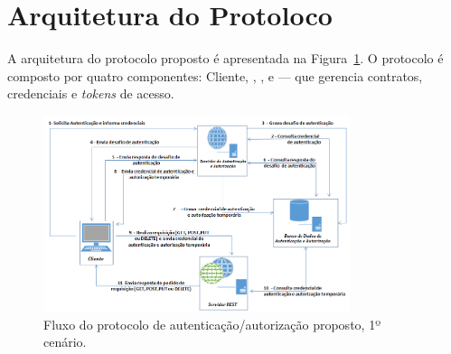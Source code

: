 
\section{Arquitetura do Protoloco}\label{sec:ArqProtocolo}

A arquitetura do protocolo proposto é apresentada na Figura~\ref{fig:arquiteturaprotocolo}. O protocolo é composto por quatro componentes: Cliente,
\servidorAA, \servidorRest, e \servidorBD--- que gerencia contratos, credenciais e \emph{tokens} de acesso.

\begin{figure}[!htb]
    \centering
    \includegraphics[width=0.8\textwidth]{arquitetura_protocolo.png}
    \caption{Fluxo do protocolo de autenticação/autorização proposto, 1º cenário.}
    \label{fig:arquiteturaprotocolo}
\end{figure}

